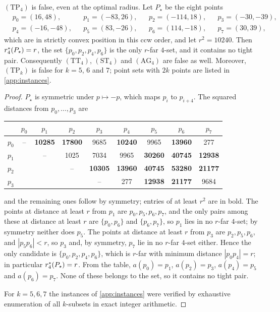 \begin{theorem}\label{thm:tightpair}
$(\mathrm{TP}_4)$ is false, even at the optimal radius. Let $P_\star$ be the
eight points
\begin{align*}
&p_0=(16,48), &&p_1=(-83,26), &&p_2=(-114,18), &&p_3=(-30,-39),\\
&p_4=(-16,-48), &&p_5=(83,-26), &&p_6=(114,-18), &&p_7=(30,39),
\end{align*}
which are in strictly convex position in this ccw order, and let
$r^2=10240$. Then $r^{*}_4(P_\star)=r$, the set $\{p_0,p_2,p_4,p_6\}$ is the
only $r$-far $4$-set, and it contains no tight pair. Consequently
$(\mathrm{TT}_4)$, $(\mathrm{ST}_4)$ and $(\mathrm{AG}_4)$ are false as well.
Moreover, $(\mathrm{TP}_k)$ is false for $k=5$, $6$ and $7$; point sets with
$2k$ points are listed in \cref{app:instances}.
\end{theorem}
\begin{proof}
$P_\star$ is symmetric under $p\mapsto-p$, which maps $p_i$ to $p_{i+4}$. The
squared distances from $p_0,\dots,p_3$ are
\begin{center}\small
\begin{tabular}{@{}c|cccccccc@{}}
 & $p_0$ & $p_1$ & $p_2$ & $p_3$ & $p_4$ & $p_5$ & $p_6$ & $p_7$\\\midrule
$p_0$ & -- & \textbf{10285} & \textbf{17800} & 9685 & \textbf{10240} & 9965 & \textbf{13960} & 277\\
$p_1$ &  & -- & 1025 & 7034 & 9965 & \textbf{30260} & \textbf{40745} & \textbf{12938}\\
$p_2$ &  &  & -- & \textbf{10305} & \textbf{13960} & \textbf{40745} & \textbf{53280} & \textbf{21177}\\
$p_3$ &  &  &  & -- & 277 & \textbf{12938} & \textbf{21177} & 9684\\
\end{tabular}
\end{center}
and the remaining ones follow by symmetry; entries of at least $r^2$ are in
bold. The points at distance at least $r$ from $p_1$ are $p_0,p_5,p_6,p_7$,
and the only pairs among these at distance at least $r$ are $\{p_0,p_6\}$ and
$\{p_6,p_7\}$, so $p_1$ lies in no $r$-far $4$-set; by symmetry neither does
$p_5$. The points at distance at least $r$ from $p_3$ are $p_2,p_5,p_6$, and
$|p_5p_6|<r$, so $p_3$ and, by symmetry, $p_7$ lie in no $r$-far $4$-set
either. Hence the only candidate is $\{p_0,p_2,p_4,p_6\}$, which is $r$-far
with minimum distance $|p_0p_4|=r$; in particular $r^{*}_4(P_\star)=r$. From
the table, $a(p_0)=p_1$, $a(p_2)=p_3$, $a(p_4)=p_5$ and $a(p_6)=p_7$. None of
these belongs to the set, so it contains no tight pair.

For $k=5,6,7$ the instances of \cref{app:instances} were verified by
exhaustive enumeration of all $k$-subsets in exact integer arithmetic.
\end{proof}

